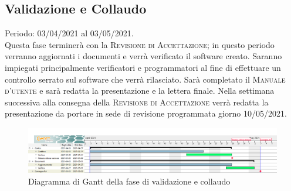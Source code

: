 \documentclass[../piano_di_progetto.tex]{subfiles}
\begin{document}
\subsection{Validazione e Collaudo}%
\label{sub:valid_coll}
Periodo: 03/04/2021 al 03/05/2021.\\
Questa fase terminerà con la \textsc{Revisione di Accettazione}; in questo periodo verranno aggiornati i documenti e verrà verificato il software creato. Saranno impiegati principalmente verificatori e programmatori al fine di effettuare un controllo serrato sul software che verrà rilasciato. Sarà completato il \textsc{Manuale d'utente} e sarà redatta la presentazione e la lettera finale. Nella settimana successiva alla consegna della \textsc{Revisione di Accettazione} verrà redatta la presentazione da portare in sede di revisione programmata giorno 10/05/2021.

\begin{figure}[H]
\centering
\includegraphics[width=18cm]{src/img/gantt/04_RA.png}
\caption{Diagramma di Gantt della fase di validazione e collaudo}
\end{figure}
\end{document}
